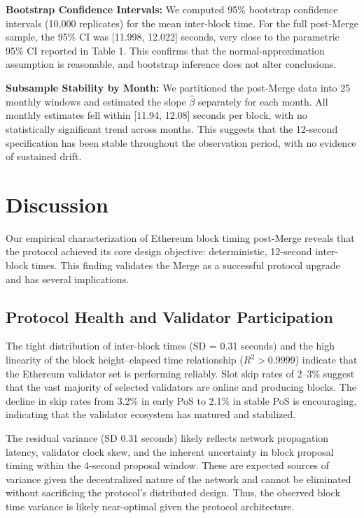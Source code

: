 \documentclass[12pt]{article}
\begin{document}
\textbf{Bootstrap Confidence Intervals:} We computed 95\% bootstrap confidence intervals (10,000 replicates) for the mean inter-block time. For the full post-Merge sample, the 95\% CI was [11.998, 12.022] seconds, very close to the parametric 95\% CI reported in Table 1. This confirms that the normal-approximation assumption is reasonable, and bootstrap inference does not alter conclusions.

\textbf{Subsample Stability by Month:} We partitioned the post-Merge data into 25 monthly windows and estimated the slope $\hat{\beta}$ separately for each month. All monthly estimates fell within [11.94, 12.08] seconds per block, with no statistically significant trend across months. This suggests that the 12-second specification has been stable throughout the observation period, with no evidence of sustained drift.

\section{Discussion}

Our empirical characterization of Ethereum block timing post-Merge reveals that the protocol achieved its core design objective: deterministic, 12-second inter-block times. This finding validates the Merge as a successful protocol upgrade and has several implications.

\subsection{Protocol Health and Validator Participation}

The tight distribution of inter-block times (SD = 0.31 seconds) and the high linearity of the block height–elapsed time relationship ($R^2 > 0.9999$) indicate that the Ethereum validator set is performing reliably. Slot skip rates of 2–3\% suggest that the vast majority of selected validators are online and producing blocks. The decline in skip rates from 3.2\% in early PoS to 2.1\% in stable PoS is encouraging, indicating that the validator ecosystem has matured and stabilized.

The residual variance (SD 0.31 seconds) likely reflects network propagation latency, validator clock skew, and the inherent uncertainty in block proposal timing within the 4-second proposal window. These are expected sources of variance given the decentralized nature of the network and cannot be eliminated without sacrificing the protocol's distributed design. Thus, the observed block time variance is likely near-optimal given the protocol architecture.
\end{document}
